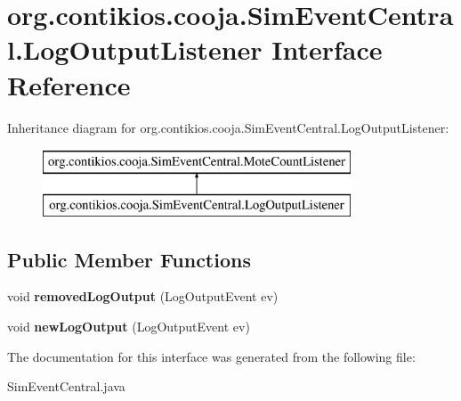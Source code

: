 \hypertarget{interfaceorg_1_1contikios_1_1cooja_1_1SimEventCentral_1_1LogOutputListener}{\section{org.\-contikios.\-cooja.\-Sim\-Event\-Central.\-Log\-Output\-Listener Interface Reference}
\label{interfaceorg_1_1contikios_1_1cooja_1_1SimEventCentral_1_1LogOutputListener}
}
Inheritance diagram for org.\-contikios.\-cooja.\-Sim\-Event\-Central.\-Log\-Output\-Listener\-:\begin{figure}[H]
\begin{center}
\leavevmode
\includegraphics[height=2.000000cm]{interfaceorg_1_1contikios_1_1cooja_1_1SimEventCentral_1_1LogOutputListener}
\end{center}
\end{figure}
\subsection*{Public Member Functions}
\begin{DoxyCompactItemize}
\item 
\hypertarget{interfaceorg_1_1contikios_1_1cooja_1_1SimEventCentral_1_1LogOutputListener_ab8e50a8b0e8fd8e20b9c9efdcb69cff5}{void {\bfseries removed\-Log\-Output} (Log\-Output\-Event ev)}\label{interfaceorg_1_1contikios_1_1cooja_1_1SimEventCentral_1_1LogOutputListener_ab8e50a8b0e8fd8e20b9c9efdcb69cff5}

\item 
\hypertarget{interfaceorg_1_1contikios_1_1cooja_1_1SimEventCentral_1_1LogOutputListener_a714c9a39742d1e8f6aee7a4dc9f62e0c}{void {\bfseries new\-Log\-Output} (Log\-Output\-Event ev)}\label{interfaceorg_1_1contikios_1_1cooja_1_1SimEventCentral_1_1LogOutputListener_a714c9a39742d1e8f6aee7a4dc9f62e0c}

\end{DoxyCompactItemize}


The documentation for this interface was generated from the following file\-:\begin{DoxyCompactItemize}
\item 
Sim\-Event\-Central.\-java\end{DoxyCompactItemize}
